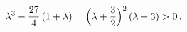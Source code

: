 \begin{equation}\lambda^3-\frac{27}{4}\,(1+\lambda)=
\Bigl(\lambda+\frac{3}{2}\Bigr)^2\,(\lambda-3)>0\,.\end{equation}

